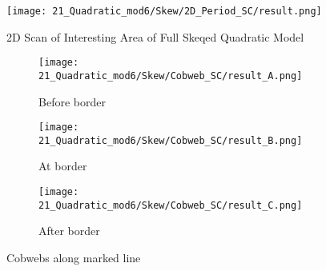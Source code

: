 \begin{figure}
	\centering
	\texttt{[image: 21\_Quadratic\_mod6/Skew/2D\_Period\_SC/result.png]}
	\caption{2D Scan of Interesting Area of Full Skeqed Quadratic Model}
	\label{fig:quadratic.full.skew.2d.c}
\end{figure}

\begin{figure}
	\centering
	\begin{subfigure}{0.3\textwidth}
		\centering
		\texttt{[image: 21\_Quadratic\_mod6/Skew/Cobweb\_SC/result\_A.png]}
		\caption{Before border}
		\label{fig:quad.full.skew.c.CobwebA}
	\end{subfigure}
	\begin{subfigure}{0.3\textwidth}
		\centering
		\texttt{[image: 21\_Quadratic\_mod6/Skew/Cobweb\_SC/result\_B.png]}
		\caption{At border}
		\label{fig:quad.full.skew.c.CobwebB}
	\end{subfigure}
	\begin{subfigure}{0.3\textwidth}
		\centering
		\texttt{[image: 21\_Quadratic\_mod6/Skew/Cobweb\_SC/result\_C.png]}
		\caption{After border}
		\label{fig:quad.full.skew.c.CobwebC}
	\end{subfigure}
	\caption{Cobwebs along marked line}
	\label{fig:quad.full.skew.c.Cobwebs}
\end{figure}
